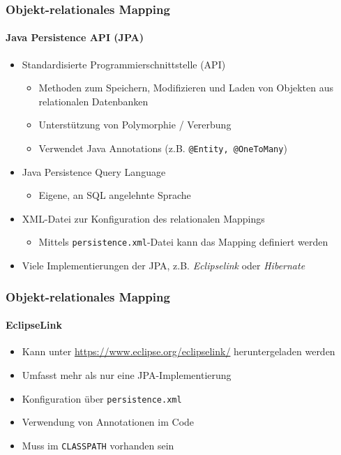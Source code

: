 \begin{frame}[t]\frametitle{Objekt-relationales Mapping}
	\framesubtitle{Java Persistence API (JPA)}
	\onslide
	\abs
	\begin{itemize}
		\item Standardisierte Programmierschnittstelle (API)
		\begin{itemize}
			\item Methoden zum Speichern, Modifizieren und Laden von Objekten aus relationalen Datenbanken
			\item Unterstützung von Polymorphie / Vererbung 
			\item Verwendet Java Annotations (z.B. \texttt{@Entity, @OneToMany})
		\end{itemize}
	\pause
		\item Java Persistence Query Language 
		\begin{itemize}
			\item Eigene, an SQL angelehnte Sprache
		\end{itemize}
		\item XML-Datei zur Konfiguration des relationalen Mappings
		\begin{itemize}
			\item Mittels \texttt{persistence.xml}-Datei kann das Mapping definiert werden
		\end{itemize}
	\pause
		\item Viele Implementierungen der JPA, z.B. \textit{Eclipselink} oder \textit{Hibernate}
	\end{itemize}
\end{frame}

\begin{frame}[t]\frametitle{Objekt-relationales Mapping}
	\framesubtitle{EclipseLink}
	\abs
	\begin{itemize}
		\item Kann unter \url{https://www.eclipse.org/eclipselink/} heruntergeladen werden
		\item Umfasst mehr als nur eine JPA-Implementierung
		\item Konfiguration über \texttt{persistence.xml}
		\item Verwendung von Annotationen im Code
		\item Muss im \texttt{CLASSPATH} vorhanden sein
	\end{itemize}
\end{frame}

